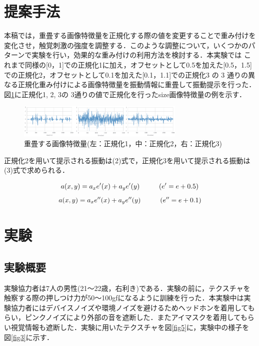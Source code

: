 \documentclass[a4paper]{jarticle}
\begin{document}
\section{提案手法}
本稿では，重畳する画像特徴量を正規化する際の値を変更することで重み付けを変化させ，触覚刺激の強度を調整する．このような調整について，いくつかのパターンで実験を行い，効果的な重み付けの利用方法を検討する．本実験では  これまで同様の[0，1]での正規化1に加え，オフセットとして0.5を加えた[0.5，1.5]での正規化2，オフセットとして0.1を加えた[0.1，1.1]での正規化3 の 3 通りの異なる正規化重み付けによる画像特徴量を振動情報に重畳して振動提示を行った．図\ref{fig2}に正規化1, 2, 3の 3通りの値で正規化を行ったsize画像特徴量の例を示す．

\begin{figure}[tb]
  \begin{center}
    \includegraphics*[width=80mm]{hikaku.eps}
  \end{center}
  \vspace*{-6mm}
  \caption{重畳する画像特徴量(左：正規化1，中：正規化2，右：正規化3)}
  \label{fig2}
\end{figure}

正規化2を用いて提示される振動は(2)式で，正規化3を用いて提示される振動は(3)式で求められる．

\begin{equation}
  a(x,y)=a_xe'(x)+a_ye'(y) \hspace{10mm}  (e' = e + 0.5) 
\end{equation}
\begin{equation}
a(x,y)=a_xe''(x)+a_ye''(y) \hspace{10mm}  (e'' = e + 0.1)
\end{equation}

\section{実験}
\subsection{実験概要}
実験協力者は7人の男性(21～22歳，右利き)である．実験の前に，テクスチャを触察する際の押しつけ力が50～100gfになるように訓練を行った．本実験中は実験協力者にはデバイスノイズや環境ノイズを避けるためヘッドホンを着用してもらい，ピンクノイズにより外部の音を遮断した．またアイマスクを着用してもらい視覚情報も遮断した．実験に用いたテクスチャを図\ref{fig5}に，実験中の様子を図\ref{fig3}に示す．
\end{document}
